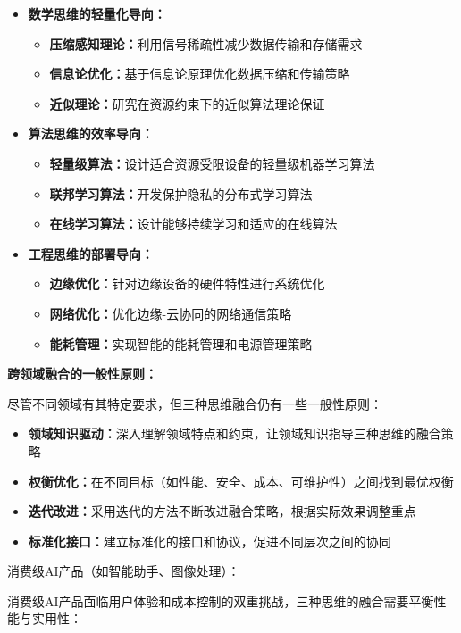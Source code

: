 \begin{itemize}
\item \textbf{数学思维的轻量化导向：}
\begin{itemize}
\item \textbf{压缩感知理论：}利用信号稀疏性减少数据传输和存储需求
\item \textbf{信息论优化：}基于信息论原理优化数据压缩和传输策略
\item \textbf{近似理论：}研究在资源约束下的近似算法理论保证
\end{itemize}

\item \textbf{算法思维的效率导向：}
\begin{itemize}
\item \textbf{轻量级算法：}设计适合资源受限设备的轻量级机器学习算法
\item \textbf{联邦学习算法：}开发保护隐私的分布式学习算法
\item \textbf{在线学习算法：}设计能够持续学习和适应的在线算法
\end{itemize}

\item \textbf{工程思维的部署导向：}
\begin{itemize}
\item \textbf{边缘优化：}针对边缘设备的硬件特性进行系统优化
\item \textbf{网络优化：}优化边缘-云协同的网络通信策略
\item \textbf{能耗管理：}实现智能的能耗管理和电源管理策略
\end{itemize}
\end{itemize}

\textbf{跨领域融合的一般性原则：}

尽管不同领域有其特定要求，但三种思维融合仍有一些一般性原则：

\begin{itemize}
\item \textbf{领域知识驱动：}深入理解领域特点和约束，让领域知识指导三种思维的融合策略
\item \textbf{权衡优化：}在不同目标（如性能、安全、成本、可维护性）之间找到最优权衡
\item \textbf{迭代改进：}采用迭代的方法不断改进融合策略，根据实际效果调整重点
\item \textbf{标准化接口：}建立标准化的接口和协议，促进不同层次之间的协同
\end{itemize}

消费级AI产品（如智能助手、图像处理）：

消费级AI产品面临用户体验和成本控制的双重挑战，三种思维的融合需要平衡性能与实用性：

